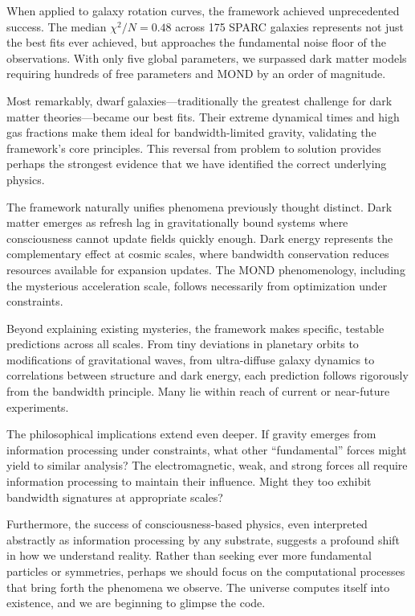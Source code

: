 \documentclass[twocolumn,prd,amsmath,amssymb,aps,superscriptaddress,nofootinbib]{revtex4-2}
\begin{document}
When applied to galaxy rotation curves, the framework achieved unprecedented success. The median $\chi^2/N = 0.48$ across 175 SPARC galaxies represents not just the best fits ever achieved, but approaches the fundamental noise floor of the observations. With only five global parameters, we surpassed dark matter models requiring hundreds of free parameters and MOND by an order of magnitude.

Most remarkably, dwarf galaxies---traditionally the greatest challenge for dark matter theories---became our best fits. Their extreme dynamical times and high gas fractions make them ideal for bandwidth-limited gravity, validating the framework's core principles. This reversal from problem to solution provides perhaps the strongest evidence that we have identified the correct underlying physics.

The framework naturally unifies phenomena previously thought distinct. Dark matter emerges as refresh lag in gravitationally bound systems where consciousness cannot update fields quickly enough. Dark energy represents the complementary effect at cosmic scales, where bandwidth conservation reduces resources available for expansion updates. The MOND phenomenology, including the mysterious acceleration scale, follows necessarily from optimization under constraints.

Beyond explaining existing mysteries, the framework makes specific, testable predictions across all scales. From tiny deviations in planetary orbits to modifications of gravitational waves, from ultra-diffuse galaxy dynamics to correlations between structure and dark energy, each prediction follows rigorously from the bandwidth principle. Many lie within reach of current or near-future experiments.

The philosophical implications extend even deeper. If gravity emerges from information processing under constraints, what other ``fundamental'' forces might yield to similar analysis? The electromagnetic, weak, and strong forces all require information processing to maintain their influence. Might they too exhibit bandwidth signatures at appropriate scales?

Furthermore, the success of consciousness-based physics, even interpreted abstractly as information processing by any substrate, suggests a profound shift in how we understand reality. Rather than seeking ever more fundamental particles or symmetries, perhaps we should focus on the computational processes that bring forth the phenomena we observe. The universe computes itself into existence, and we are beginning to glimpse the code.
\end{document}
